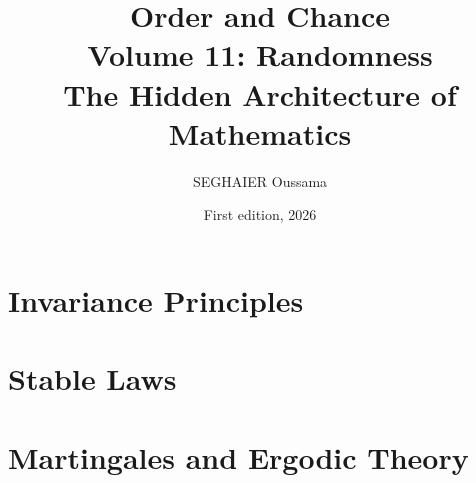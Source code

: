\documentclass[11pt,openany]{book}
\title{\Huge\textbf{Order and Chance}\\[0.4em]\LARGE Volume 11: Randomness\\[0.6em]
\Large The Hidden Architecture of Mathematics}
\author{SEGHAIER Oussama}
\date{First edition, 2026}
\begin{document}
\frontmatter
\makecover
\maketitle

\tableofcontents

\mainmatter

\part{Invariance Principles}




\part{Stable Laws}




\part{Martingales and Ergodic Theory}








\end{document}
